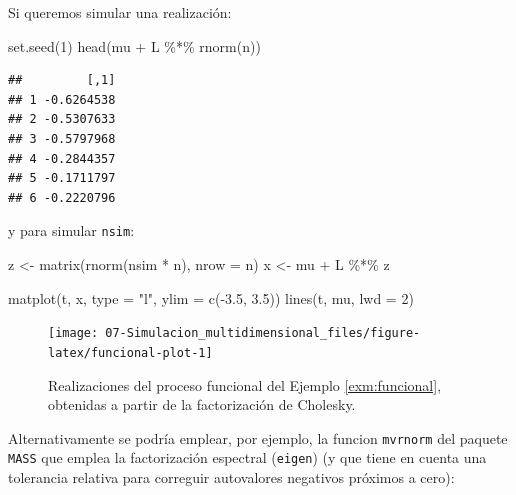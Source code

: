 \documentclass[
]{book}
\newenvironment{Shaded}{\begin{snugshade}}{\end{snugshade}}
\newcommand{\AttributeTok}[1]{\textcolor[rgb]{0.77,0.63,0.00}{#1}}
\newcommand{\DecValTok}[1]{\textcolor[rgb]{0.00,0.00,0.81}{#1}}
\newcommand{\FloatTok}[1]{\textcolor[rgb]{0.00,0.00,0.81}{#1}}
\newcommand{\FunctionTok}[1]{\textcolor[rgb]{0.00,0.00,0.00}{#1}}
\newcommand{\NormalTok}[1]{#1}
\newcommand{\OtherTok}[1]{\textcolor[rgb]{0.56,0.35,0.01}{#1}}
\newcommand{\SpecialCharTok}[1]{\textcolor[rgb]{0.00,0.00,0.00}{#1}}
\newcommand{\StringTok}[1]{\textcolor[rgb]{0.31,0.60,0.02}{#1}}
\theoremstyle{break}
\theoremstyle{definition}
\theoremstyle{definition}
\theoremstyle{definition}
\theoremstyle{definition}
\theoremstyle{remark}
\begin{document}
Si queremos simular una realización:

\begin{Shaded}
\begin{Highlighting}[]
\FunctionTok{set.seed}\NormalTok{(}\DecValTok{1}\NormalTok{)}
\FunctionTok{head}\NormalTok{(mu }\SpecialCharTok{+}\NormalTok{ L }\SpecialCharTok{\%*\%} \FunctionTok{rnorm}\NormalTok{(n))}
\end{Highlighting}
\end{Shaded}

\begin{verbatim}
##         [,1]
## 1 -0.6264538
## 2 -0.5307633
## 3 -0.5797968
## 4 -0.2844357
## 5 -0.1711797
## 6 -0.2220796
\end{verbatim}

y para simular \texttt{nsim}:



\begin{Shaded}
\begin{Highlighting}[]
\NormalTok{z }\OtherTok{\textless{}{-}} \FunctionTok{matrix}\NormalTok{(}\FunctionTok{rnorm}\NormalTok{(nsim }\SpecialCharTok{*}\NormalTok{ n), }\AttributeTok{nrow =}\NormalTok{ n)}
\NormalTok{x }\OtherTok{\textless{}{-}}\NormalTok{ mu }\SpecialCharTok{+}\NormalTok{ L }\SpecialCharTok{\%*\%}\NormalTok{ z}

\FunctionTok{matplot}\NormalTok{(t, x, }\AttributeTok{type =} \StringTok{"l"}\NormalTok{, }\AttributeTok{ylim =} \FunctionTok{c}\NormalTok{(}\SpecialCharTok{{-}}\FloatTok{3.5}\NormalTok{, }\FloatTok{3.5}\NormalTok{))}
\FunctionTok{lines}\NormalTok{(t, mu, }\AttributeTok{lwd =} \DecValTok{2}\NormalTok{)}
\end{Highlighting}
\end{Shaded}

\begin{figure}[!htb]

{\centering \texttt{[image: 07-Simulacion\_multidimensional\_files/figure-latex/funcional-plot-1]} 

}

\caption{Realizaciones del proceso funcional del Ejemplo \ref{exm:funcional}, obtenidas a partir de la factorización de Cholesky.}\label{fig:funcional-plot}
\end{figure}

Alternativamente se podría emplear, por ejemplo, la funcion \texttt{mvrnorm}
del paquete \texttt{MASS} que emplea la factorización espectral (\texttt{eigen}) (y que tiene en cuenta una tolerancia relativa para correguir autovalores negativos próximos a cero):
\end{document}
